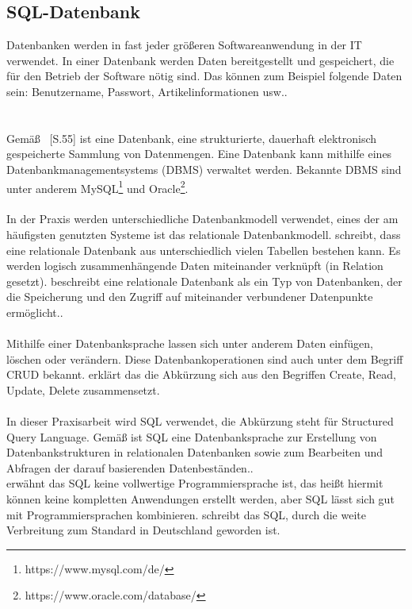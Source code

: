 \subsection{SQL-Datenbank}\label{sQL-Datenbank}
Datenbanken werden in fast jeder größeren Softwareanwendung in der IT verwendet. 
In einer Datenbank werden Daten bereitgestellt und gespeichert, die für den Betrieb der Software nötig sind.
Das können zum Beispiel folgende Daten sein: Benutzername, Passwort, Artikelinformationen usw..
\\
\\
\\
Gemäß \cite{win08} ~[S.55] ist eine Datenbank, eine strukturierte, dauerhaft elektronisch gespeicherte Sammlung von Datenmengen. Eine Datenbank kann mithilfe eines Datenbankmanagementsystems (DBMS) verwaltet werden. Bekannte DBMS sind unter anderem MySQL\footnote{https://www.mysql.com/de/} und Oracle\footnote{https://www.oracle.com/database/}. 
\\
\\
In der Praxis werden unterschiedliche Datenbankmodell verwendet, eines der am häufigsten genutzten Systeme ist das relationale Datenbankmodell. 
\cite{t3rationaleDatenbank} schreibt, dass eine relationale Datenbank aus unterschiedlich vielen Tabellen bestehen kann. Es werden logisch zusammenhängende Daten miteinander verknüpft (in Relation gesetzt). \cite{oracleDB} beschreibt eine relationale Datenbank als \glqq ein Typ von Datenbanken, der die Speicherung und den Zugriff auf miteinander verbundener Datenpunkte ermöglicht.\grqq{}.
\\
\\
Mithilfe einer Datenbanksprache lassen sich unter anderem Daten einfügen, löschen oder verändern. Diese Datenbankoperationen sind auch unter dem Begriff CRUD bekannt. \cite{db2222} erklärt das die Abkürzung sich aus den Begriffen Create, Read, Update, Delete zusammensetzt.
\\
\\
In dieser Praxisarbeit wird SQL verwendet, die Abkürzung steht für Structured Query Language. Gemäß \cite{datenbankenVerstehen} ist SQL \glqq eine Datenbanksprache zur Erstellung von Datenbankstrukturen in relationalen Datenbanken sowie zum Bearbeiten und Abfragen der darauf basierenden Datenbeständen.\grqq{}.
\\
\cite{Lub17} erwähnt das SQL keine vollwertige Programmiersprache ist, das heißt hiermit können keine kompletten Anwendungen erstellt werden, aber SQL lässt sich gut mit Programmiersprachen kombinieren. \cite{bitfarm} schreibt das SQL, durch die weite Verbreitung zum Standard in Deutschland geworden ist.
